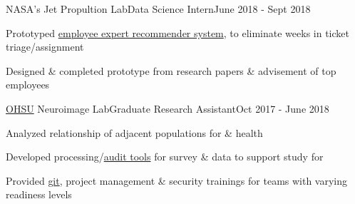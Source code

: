 \documentclass{article}
\newenvironment{**mylist}[4][]%
{%
\subsubsection*{%
    \censor{#2}\tabb #3%
    \if\relax\detokenize{#1}\relax
    \else
      {\;\;(#1)}%
    \fi
    \hfill #4%
}%

\small
  \begin{itemize}%
    \setlength{\topsep}{.2pt}%
    \setlength{\partopsep}{0pt}
    \setlength{\itemsep}{.6pt}%
    \setlength{\parskip}{0pt}%
    \setlength{\parsep}{0pt}%
}%
{%
  \end{itemize}%
}
\newcommand{\LU}[1]{\hspace{-1em}{\bf Technologies : #1}}
\def\PT{{\bf(Part Time)}\xspace}
\def\grd{Graduate\xspace}
\begin{document}

\begin{**mylist}{NASA's Jet Propultion Lab}{Data Science Intern}{June 2018 - Sept 2018}
\item Prototyped \href{https://www.youtube.com/watch?v=_Oa4aSXjzhs}{employee expert recommender system}, to eliminate weeks in ticket triage/assignment
\item Designed \& completed prototype from research papers \& advisement of top  employees
\end{**mylist}


\begin{**mylist}[Medical]{\href{https://www.ohsu.edu/xd/research/centers-institutes/center-for-spoken-language-understanding/}{OHSU} Neuroimage Lab}{\grd Research Assistant}{Oct 2017 - June 2018}
\item Analyzed relationship of adjacent  populations for  \&  health
\item Developed processing/\href{https://gitlab.com/Fair_lab/HCPVaTT}{audit tools} for survey \&  data to support \href{https://abcdstudy.org/study-sites/ohsu/}{}  study for 
\item Provided \href{https://github.com/probinso/ABC}{git}, project management \& security trainings for teams with varying readiness levels
\end{**mylist}
\end{document}
